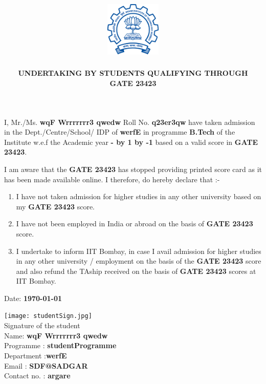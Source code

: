 \documentclass[12pt]{article}
\title{%
\includegraphics[width=0.2\textwidth]{logo.png}
\\[1cm]
\textbf{\myfont{INDIAN INSTITUTE OF TECHNOLOGY BOMBAY
\\Academic Office}}}
\author{\textbf{UNDERTAKING BY STUDENTS QUALIFYING THROUGH} \\ \textbf{\large{GATE 23423}}}
\date{}
\newcommand\NextYear{%
  \advance\year by 1 \the\year\advance\year by -1}
\begin{document}
\maketitle
I, Mr./Ms.  \textbf{\large{wqF Wrrrrrrr3 qwedw}}  Roll No.     \textbf{\large{q23er3qw}}
have taken admission in the Dept./Centre/School/ IDP of \textbf{\large{werfE}}  
in programme 
  \textbf{\large{B.Tech}}  of the Institute w.e.f the Academic year \textbf{\the\year-\NextYear} based on a
valid score in \textbf{\large{GATE 23423}}.


I am aware that the \textbf{\large{GATE 23423}} has stopped providing printed score card as it has been
made available online. I therefore, do hereby declare that :-

\begin{enumerate}
    \item I have not taken admission for higher studies in any other university based on my \textbf{\large{GATE 23423}} score.
    \item I have not been employed in India or abroad on the basis of \textbf{\large{GATE 23423}} score.
    \item I undertake to inform IIT Bombay, in case I avail admission for higher studies in any other
university / employment on the basis of the \textbf{\large{GATE 23423}} score and also refund
the TAship received on the basis of \textbf{\large{GATE 23423}} scores at IIT Bombay.


\end{enumerate}
\vspace{2cm}
Date: \textbf{\today}
\begin{flushright}

\texttt{[image: studentSign.jpg]}\\
Signature of the student\\
Name: \textbf{\large{wqF Wrrrrrrr3 qwedw}}\\
Programme : \textbf{\large{studentProgramme}}\\
 Department :\textbf{\large{werfE}}\\
Email : \textbf{\large{SDF@SADGAR}}\\
 Contact no. : \textbf{\large{argare}}\\
\end{flushright}
\end{document}
